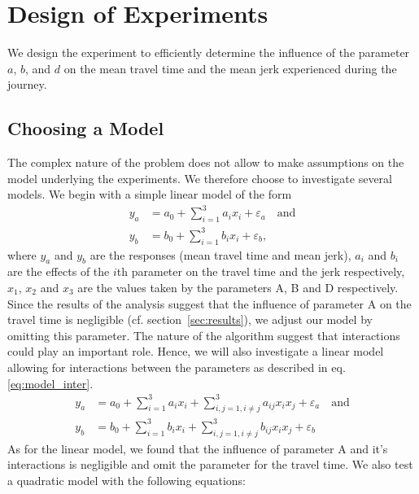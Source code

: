 \section{Design of Experiments}

We design the experiment to efficiently determine the influence of the  parameter $a$, $b$, and $d$ on the mean travel time and the mean jerk experienced during the journey.

\subsection{Choosing a Model}
The complex nature of the problem does not allow to make assumptions on the model underlying the experiments. We therefore choose to investigate several models. We begin with a simple linear model of the form
\begin{subequations}\label{eq:model_lin}
\begin{align}
	y_a &= a_0 + \displaystyle\sum_{i=1}^{3} a_i x_i + \varepsilon_a \quad \text{and}\\ 
	y_b &= b_0 + \displaystyle\sum_{i=1}^{3} b_i x_i + \varepsilon_b,
\end{align}
\end{subequations}
where $y_a$ and $y_b$ are the responses (mean travel time and mean jerk), $a_i$ and $b_i$ are the effects of the $i$th parameter on the travel time and the jerk respectively, $x_1$, $x_2$ and $x_3$ are the values taken by the parameters A, B and D respectively. Since the results of the analysis suggest that the influence of parameter A on the travel time is negligible (cf. section~\ref{sec:results}), we adjust our model by omitting this parameter.
The nature of the algorithm suggest that interactions could play an important role. Hence, we will also investigate a linear model allowing for interactions between the parameters as described in eq. \ref{eq:model_inter}.
\begin{subequations}\label{eq:model_inter}
\begin{align}
	y_a &= a_0 + \displaystyle\sum_{i=1}^{3} a_i x_i + \displaystyle\sum_{i,j=1, i \neq j}^{3} a_{ij} x_i x_j + \varepsilon_a \quad \text{and}\\ 
	y_b &= b_0 + \displaystyle\sum_{i=1}^{3} b_i x_i + \displaystyle\sum_{i,j=1, i \neq j}^{3} b_{ij} x_i x_j + \varepsilon_b
\end{align}
\end{subequations}
As for the linear model, we found that the influence of parameter A and it's interactions is negligible and omit the parameter for the travel time. We also test a quadratic model with the following equations:
